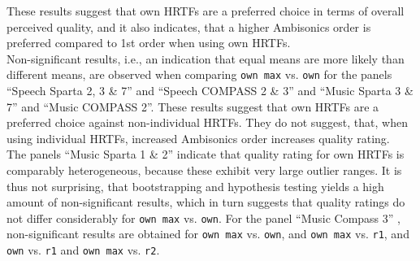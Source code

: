 \documentclass[conference]{IEEEtran}
\def\NewL{\\\noindent\hspace*{5mm}}
\begin{document}
%
These results suggest that own HRTFs are a preferred choice in terms of overall perceived quality, and it also indicates, that a higher Ambisonics order is preferred compared to 1st order when using own HRTFs.
%
\NewL Non-significant results, i.e., an indication that equal means are more likely than different means, are observed when comparing \texttt{own max} vs. \texttt{own} for the panels
%
\quad``Speech Sparta 2, 3 \& 7'' \quad and
\quad``Speech COMPASS 2 \& 3'' \quad and
\quad``Music Sparta 3 \& 7'' \quad and
\quad``Music COMPASS 2''.
%
These results suggest that own HRTFs are a preferred choice against non-individual HRTFs.
%
They do not suggest, that, when using individual HRTFs, increased Ambisonics order increases quality rating.
%
\NewL The panels \quad ``Music Sparta 1 \& 2'' \quad indicate that quality rating for own HRTFs is comparably heterogeneous, because these exhibit very large outlier ranges.
%
It is thus not surprising, that bootstrapping and hypothesis testing yields a high amount of non-significant results, which in turn suggests that quality ratings do not differ considerably for \texttt{own max} vs. \texttt{own}.
%
For the panel \quad ``Music Compass 3'' \quad, non-significant results are obtained for \texttt{own max} vs. \texttt{own}, and \texttt{own max} vs. \texttt{r1}, and \texttt{own} vs. \texttt{r1} and \texttt{own max} vs. \texttt{r2}.
%
%
\end{document}
